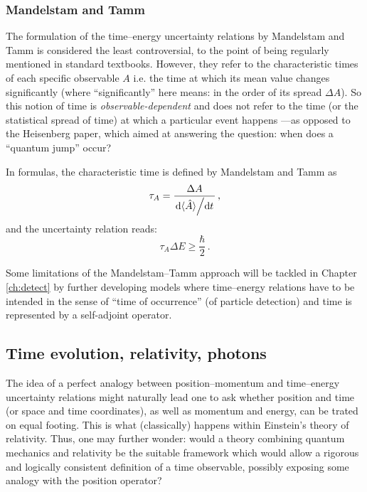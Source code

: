 \subsubsection{Mandelstam and Tamm}

The formulation of the time--energy uncertainty relations by Mandelstam and Tamm
\parencite{MandelstamTamm} is considered the least controversial, to the point
of being regularly mentioned in standard textbooks. However,
they refer to the characteristic times of each specific observable $A$ i.e.
the time at which its mean value changes significantly (where ``significantly''
here means: in the order of its spread $\Delta{A}$). So this notion of time
is \emph{observable-dependent} and does not refer to the time (or the statistical spread of time)
at which a particular event happens
---as opposed to the Heisenberg paper, which aimed at answering the question: when does
a ``quantum jump'' occur?

In formulas, the characteristic time is defined by Mandelstam and Tamm as
\begin{equation}
  \tau_{A} = \frac{ \Delta{A} } { \dv*{\langle\hat{A}\rangle}{t} } \, \text{,}
\end{equation}
and the uncertainty relation reads:
\begin{equation}
  \tau_{A}\Delta{E} \ge \frac{\hbar}{2} \, \text{.}
\end{equation}

Some limitations of the Mandelstam--Tamm
approach
will be tackled
in
Chapter \ref{ch:detect}
by further developing
models where time--energy relations have to be intended in the sense
of ``time of occurrence'' (of particle detection)
and time is represented
by a self-adjoint operator.

\subsection{Time evolution, relativity, photons}\label{sec:trel}

The idea of a perfect analogy between
position--momentum and time--energy uncertainty relations 
might naturally lead one to ask whether position and time
(or space and time coordinates), as well as momentum and energy, can be trated on
equal footing. This is what (classically) happens within Einstein's theory of relativity.
Thus, one may further wonder:
would a theory combining quantum mechanics and
relativity be the suitable framework which would allow a rigorous and logically consistent
definition of a time observable,
possibly exposing some analogy with the position operator?

